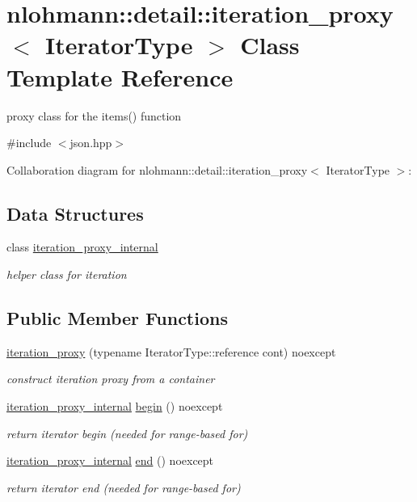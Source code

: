 \hypertarget{classnlohmann_1_1detail_1_1iteration__proxy}{}\section{nlohmann\+:\+:detail\+:\+:iteration\+\_\+proxy$<$ Iterator\+Type $>$ Class Template Reference}
\label{classnlohmann_1_1detail_1_1iteration__proxy}


proxy class for the items() function  




{\ttfamily \#include $<$json.\+hpp$>$}



Collaboration diagram for nlohmann\+:\+:detail\+:\+:iteration\+\_\+proxy$<$ Iterator\+Type $>$\+:
\subsection*{Data Structures}
\begin{DoxyCompactItemize}
\item 
class \hyperlink{classnlohmann_1_1detail_1_1iteration__proxy_1_1iteration__proxy__internal}{iteration\+\_\+proxy\+\_\+internal}
\begin{DoxyCompactList}\small\item\em helper class for iteration \end{DoxyCompactList}\end{DoxyCompactItemize}
\subsection*{Public Member Functions}
\begin{DoxyCompactItemize}
\item 
\hyperlink{classnlohmann_1_1detail_1_1iteration__proxy_afe257e972e3b4658ef2e355f7389d4a5}{iteration\+\_\+proxy} (typename Iterator\+Type\+::reference cont) noexcept
\begin{DoxyCompactList}\small\item\em construct iteration proxy from a container \end{DoxyCompactList}\item 
\hyperlink{classnlohmann_1_1detail_1_1iteration__proxy_1_1iteration__proxy__internal}{iteration\+\_\+proxy\+\_\+internal} \hyperlink{classnlohmann_1_1detail_1_1iteration__proxy_a43612db469c82118fc648c3729e40cee}{begin} () noexcept
\begin{DoxyCompactList}\small\item\em return iterator begin (needed for range-\/based for) \end{DoxyCompactList}\item 
\hyperlink{classnlohmann_1_1detail_1_1iteration__proxy_1_1iteration__proxy__internal}{iteration\+\_\+proxy\+\_\+internal} \hyperlink{classnlohmann_1_1detail_1_1iteration__proxy_a41303419d073f32fcf1956978410d816}{end} () noexcept
\begin{DoxyCompactList}\small\item\em return iterator end (needed for range-\/based for) \end{DoxyCompactList}\end{DoxyCompactItemize}
